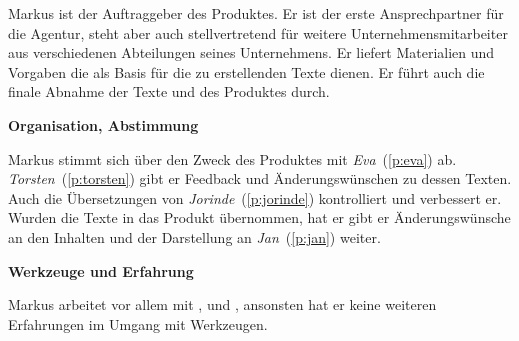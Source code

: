\begin{multicols}{2}

\begin{center}
\end{center}


Markus ist der Auftraggeber des Produktes. Er ist der erste Ansprechpartner für die Agentur, steht aber auch stellvertretend für weitere Unternehmensmitarbeiter aus verschiedenen Abteilungen seines Unternehmens. Er liefert Materialien und Vorgaben die als Basis für die zu erstellenden Texte dienen. Er führt auch die finale Abnahme der Texte und des Produktes durch.

\textbf{Organisation, Abstimmung}

Markus stimmt sich über den Zweck des Produktes mit \emph{Eva}~(\ref{p:eva}) ab. \emph{Torsten}~(\ref{p:torsten}) gibt er Feedback und Änderungswünschen zu dessen Texten. Auch die Übersetzungen von \emph{Jorinde}~(\ref{p:jorinde}) kontrolliert und verbessert er. Wurden die Texte in das Produkt übernommen, hat er gibt er Änderungswünsche an den Inhalten und der Darstellung an \emph{Jan}~(\ref{p:jan}) weiter.

\textbf{Werkzeuge und Erfahrung}

Markus arbeitet vor allem mit ,  und , ansonsten hat er keine weiteren Erfahrungen im Umgang mit Werkzeugen.

\columnbreak


\end{multicols}
